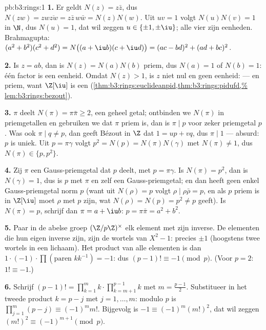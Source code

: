 \begin{solution}{pb:b3:rings:1}
\textbf{1.} Er geldt $N(z) = z\bar z$, dus $N(zw) =
zw\overline{zw} = z\bar z\, w \bar w = N(z)N(w)$. Uit $uv = 1$
volgt $N(u)N(v) = 1$ in $\N$, dus $N(u) = 1$, dat wil zeggen $u \in
\{\pm 1, \pm \iu\}$; alle vier zijn eenheden. Brahmagupta:
$(a^2+b^2)(c^2+d^2) = N\bigl((a + \iu b)(c + \iu d)\bigr) = (ac -
bd)^2 + (ad + bc)^2$.

\textbf{2.} Is $z = ab$, dan is $N(z) = N(a)N(b)$ priem, dus $N(a)
= 1$ of $N(b) = 1$: één factor is een eenheid. Omdat $N(z) > 1$, is
$z$ niet nul en geen eenheid:  --- en priem, want
$\Z[\iu]$ is een 
(\cref{thm:b3:rings:euclideanpid,thm:b3:rings:pidufd,%
lem:b3:rings:bezout}).

\textbf{3.} $\pi$ deelt $N(\pi) = \pi\bar\pi \geq 2$, een geheel
getal; ontbinden we $N(\pi)$ in priemgetallen en gebruiken we dat
$\pi$ priem is, dan is $\pi \mid p$ voor zeker priemgetal $p$. Was
ook $\pi \mid q \neq p$, dan geeft Bézout in $\Z$ dat $1 = up +
vq$, dus $\pi \mid 1$ --- absurd: $p$ is uniek. Uit $p = \pi\gamma$
volgt $p^2 = N(p) = N(\pi)N(\gamma)$ met $N(\pi) \neq 1$, dus
$N(\pi) \in \{p, p^2\}$.

\textbf{4.} Zij $\pi$ een Gauss-priemgetal dat $p$ deelt, met $p =
\pi\gamma$. Is $N(\pi) = p^2$, dan is $N(\gamma) = 1$, dus is $p$
 met $\pi$ en zelf een Gauss-priemgetal; en dan heeft
geen enkel Gauss-priemgetal norm $p$ (want uit $N(\rho) = p$ volgt
$\rho \mid \rho\bar\rho = p$, en als $p$ priem is in $\Z[\iu]$ moet
$\rho$ met $p$  zijn, wat $N(\rho) = N(p) = p^2 \neq p$
geeft). Is $N(\pi) = p$, schrijf dan $\pi = a + \iu b$: $p =
\pi\bar\pi = a^2 + b^2$.

\textbf{5.} Paar in de abelse groep $(\Z/p\Z)^\times$ elk element
met zijn inverse. De elementen die hun eigen inverse zijn, zijn de
wortels van $X^2 - 1$: precies $\pm 1$ (hoogstens twee wortels in
een lichaam). Het product van alle elementen is dan $1 \cdot (-1)
\cdot \prod (\text{paren } k k^{-1}) = -1$: dus $(p-1)! \equiv -1
\pmod p$. (Voor $p = 2$: $1! \equiv -1$.)

\textbf{6.} Schrijf $(p-1)! = \prod_{k=1}^m k \cdot
\prod_{k=m+1}^{p-1}k$ met $m = \frac{p-1}2$. Substitueer in het
tweede product $k = p - j$ met $j = 1, \dots, m$: modulo $p$ is
$\prod_{j=1}^m (p - j) \equiv (-1)^m m!$. Bijgevolg is $-1 \equiv
(-1)^m (m!)^2$, dat wil zeggen $(m!)^2 \equiv (-1)^{m+1} \pmod p$.


\end{solution}
